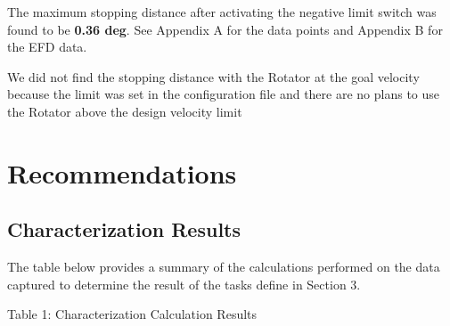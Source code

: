 \documentclass[SE,lsstdraft,authoryear,toc]{lsstdoc}
\begin{document}
The maximum stopping distance after activating the negative limit switch
was found to be \textbf{0.36 deg}. See Appendix A for the data points
and Appendix B for the EFD data.

We did not find the stopping distance with the Rotator at the goal
velocity because the limit was set in the configuration file and there
are no plans to use the Rotator above the design velocity limit

\hypertarget{recommendations}{%
\section{Recommendations}\label{recommendations}}

\hypertarget{characterization-results}{%
\subsection{Characterization Results}\label{characterization-results}}

The table below provides a summary of the calculations performed on the
data captured to determine the result of the tasks define in Section 3.

Table 1: Characterization Calculation Results
\end{document}

